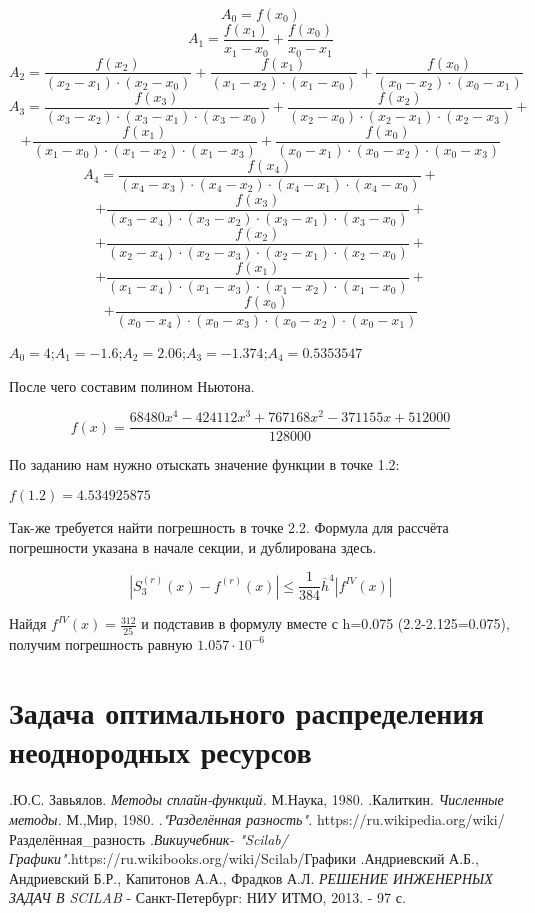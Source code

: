 \documentclass[russian,utf8,nocolumnxxxi,nocolumnxxxii]{eskdtext}
\begin{document}
   $$A_0=f(x_0)$$
   \vspace{20pt}
   $$A_1=\frac{f(x_1)}{x_1-x_0}+\frac{f(x_0)}{x_0-x_1}$$
   \vspace{20pt}
   $$A_2=\frac{f(x_2)}{(x_2-x_1) \cdot (x_2-x_0)} + \frac{f(x_1)}{(x_1-x_2) \cdot (x_1-x_0)} + \frac{f(x_0)}{(x_0-x_2) \cdot (x_0-x_1)}$$
   \vspace{20pt}
   $$A_3=\frac{f(x_3)}{(x_3-x_2) \cdot (x_3-x_1) \cdot (x_3-x_0)} + \frac{f(x_2)}{(x_2-x_0) \cdot (x_2-x_1) \cdot (x_2-x_3)} +$$ 
   $$+ \frac{f(x_1)}{(x_1-x_0) \cdot (x_1-x_2) \cdot (x_1-x_3)} + \frac{f(x_0)}{(x_0-x_1) \cdot (x_0-x_2) \cdot (x_0-x_3)}$$
   \vspace{20pt}
   $$A_4=\frac{f(x_4)}{(x_4-x_3) \cdot (x_4-x_2) \cdot (x_4-x_1) \cdot (x_4-x_0)} +$$
   $$+ \frac{f(x_3)}{(x_3-x_4) \cdot (x_3-x_2) \cdot (x_3-x_1) \cdot (x_3-x_0)} +$$
   $$+ \frac{f(x_2)}{(x_2-x_4) \cdot (x_2-x_3) \cdot (x_2-x_1) \cdot (x_2-x_0)} +$$
   $$+ \frac{f(x_1)}{(x_1-x_4) \cdot (x_1-x_3) \cdot (x_1-x_2) \cdot (x_1-x_0)} +$$
   $$+ \frac{f(x_0)}{(x_0-x_4) \cdot (x_0-x_3) \cdot (x_0-x_2) \cdot (x_0-x_1)}$$
   
   \vspace{20pt}
   
   $A_0=4$;$A_1=-1.6$;$A_2=2.06$;$A_3=-1.374$;$A_4=0.5353547$
   
   \newpage
   
   После чего составим полином Ньютона.
   
   $$f(x)=\frac{68480x^4-424112x^3+767168x^2-371155x+512000}{128000}$$
   
   По заданию нам нужно отыскать значение функции в точке 1.2:
   
   $f(1.2)=4.534925875$
   
   Так-же требуется найти погрешность в точке 2.2. Формула для рассчёта погрешности указана в начале секции, и дублирована здесь.
   
    $$|S_3^{(r)}(x)-f^{(r)}(x)|\leqslant \frac{1}{384}\overline{h}^4|f^{IV}(x)|$$
    
    Найдя $f^{IV}(x) = \frac{312}{25}$ и подставив в формулу вместе с h=0.075 (2.2-2.125=0.075), получим погрешность равную $1.057 \cdot 10^{-6}$
    
    \newpage
    \section{Задача оптимального распределения неоднородных ресурсов}
    
   
   
   

   
\newpage
\begin{thebibliography}{}
    \bibitem .Ю.С. Завьялов. \textit{Методы сплайн-функций.} М.Наука, 1980.
    \bibitem .Калиткин. \textit{Численные методы.} М.,Мир, 1980.
    \bibitem  .\textit{"Разделённая разность".} https://ru.wikipedia.org/wiki/Разделённая\_разность
    \bibitem .\textit{Викиучебник- "Scilab/Графики".}https://ru.wikibooks.org/wiki/Scilab/Графики
    \bibitem .Андриевский А.Б., Андриевский Б.Р., Капитонов А.А., Фрадков А.Л. \textit{РЕШЕНИЕ ИНЖЕНЕРНЫХ ЗАДАЧ В SCILAB} - Санкт-Петербург: НИУ ИТМО, 2013. - 97 с.
    
\end{thebibliography}
\end{document}
